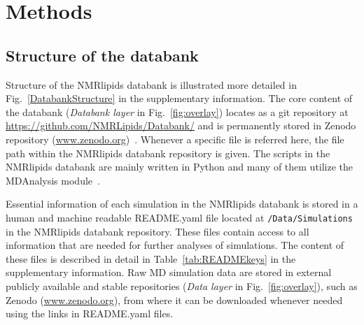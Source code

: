 \documentclass[fleqn,10pt]{wlscirep}
\begin{document}
\newpage


\section{Methods}


\subsection{Structure of the databank}
Structure of the NMRlipids databank is illustrated more detailed in Fig.~\ref{DatabankStructure} in the supplementary information. The core content of the databank (\textit{Databank layer} in Fig.~\ref{fig:overlay}) locates as a git repository at \url{https://github.com/NMRLipids/Databank/} and is permanently stored in Zenodo repository (\url{www.zenodo.org})~\cite{??}. Whenever a specific file is referred here, the file path within the NMRlipids databank repository is given. The scripts in the NMRlipids databank are mainly written in Python and many of them utilize the MDAnalysis module~\cite{gowers2019mdanalysis,michaud2011mdanalysis}.

Essential information of each simulation in the NMRlipids databank is stored in a human and machine readable README.yaml file located at \texttt{/Data/Simulations} in the NMRlipids databank repository. These files contain access to all information that are needed for further analyses of simulations. The content of these files is described in detail in Table~\ref{tab:READMEkeys} in the supplementary information. 
Raw MD simulation data are stored in external publicly available and stable repositories (\textit{Data layer} in Fig.~\ref{fig:overlay}), such as Zenodo (\url{www.zenodo.org}), from where it can be downloaded whenever needed using the links in README.yaml files.  
\end{document}
